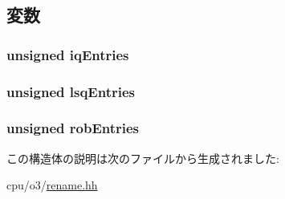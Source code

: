 \subsection{変数}
\hypertarget{structDefaultRename_1_1FreeEntries_ad0ea8223895ed6e0525ab5d0ecbc1baf}{
\subsubsection[{iqEntries}]{\setlength{\rightskip}{0pt plus 5cm}unsigned {\bf iqEntries}}}
\label{structDefaultRename_1_1FreeEntries_ad0ea8223895ed6e0525ab5d0ecbc1baf}
\hypertarget{structDefaultRename_1_1FreeEntries_a0251753eeeeffa9ebc3c69909dc95dc2}{
\subsubsection[{lsqEntries}]{\setlength{\rightskip}{0pt plus 5cm}unsigned {\bf lsqEntries}}}
\label{structDefaultRename_1_1FreeEntries_a0251753eeeeffa9ebc3c69909dc95dc2}
\hypertarget{structDefaultRename_1_1FreeEntries_a4abcd7f900b12d143638dc56a18dd81b}{
\subsubsection[{robEntries}]{\setlength{\rightskip}{0pt plus 5cm}unsigned {\bf robEntries}}}
\label{structDefaultRename_1_1FreeEntries_a4abcd7f900b12d143638dc56a18dd81b}


この構造体の説明は次のファイルから生成されました:\begin{DoxyCompactItemize}
\item 
cpu/o3/\hyperlink{rename_8hh}{rename.hh}\end{DoxyCompactItemize}
